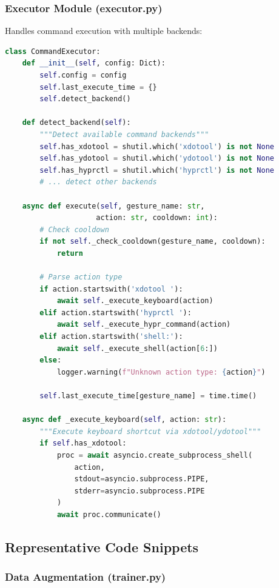 \documentclass[11pt,a4paper]{article}
\begin{document}
\subsubsection{Executor Module (executor.py)}

Handles command execution with multiple backends:

\begin{lstlisting}[language=Python]
class CommandExecutor:
    def __init__(self, config: Dict):
        self.config = config
        self.last_execute_time = {}
        self.detect_backend()
    
    def detect_backend(self):
        """Detect available command backends"""
        self.has_xdotool = shutil.which('xdotool') is not None
        self.has_ydotool = shutil.which('ydotool') is not None
        self.has_hyprctl = shutil.which('hyprctl') is not None
        # ... detect other backends
    
    async def execute(self, gesture_name: str, 
                     action: str, cooldown: int):
        # Check cooldown
        if not self._check_cooldown(gesture_name, cooldown):
            return
        
        # Parse action type
        if action.startswith('xdotool '):
            await self._execute_keyboard(action)
        elif action.startswith('hyprctl '):
            await self._execute_hypr_command(action)
        elif action.startswith('shell:'):
            await self._execute_shell(action[6:])
        else:
            logger.warning(f"Unknown action type: {action}")
        
        self.last_execute_time[gesture_name] = time.time()
    
    async def _execute_keyboard(self, action: str):
        """Execute keyboard shortcut via xdotool/ydotool"""
        if self.has_xdotool:
            proc = await asyncio.create_subprocess_shell(
                action,
                stdout=asyncio.subprocess.PIPE,
                stderr=asyncio.subprocess.PIPE
            )
            await proc.communicate()
\end{lstlisting}

\subsection{Representative Code Snippets}

\subsubsection{Data Augmentation (trainer.py)}
\end{document}

